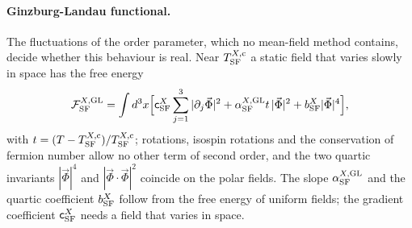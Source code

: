 \documentclass[aps,prd,twocolumn,superscriptaddress,nofootinbib,floatfix,longbibliography]{revtex4-2}
\newcommand{\SF}{{\rm SF}}
\begin{document}
\paragraph*{Ginzburg-Landau functional.}
The fluctuations of the order parameter, which no mean-field method contains, decide whether this behaviour is real.
Near $T^{X,{\rm c}}_\SF$ a static field that varies slowly in space has the free energy
\begin{equation}
\mathcal F^{X,{\rm GL}}_\SF=\int d^3x\Big[\mathsf c^X_\SF\sum_{j=1}^3|\partial_j\vec\Phi|^2+\alpha^{X,{\rm GL}}_\SF t\,|\vec\Phi|^2+b^X_\SF|\vec\Phi|^4\Big],
\label{eq:GL}
\end{equation}
with $t=(T-T^{X,{\rm c}}_\SF)/T^{X,{\rm c}}_\SF$; rotations, isospin rotations and the conservation of fermion number allow no other
term of second order, and the two quartic invariants $|\vec\Phi|^4$ and $|\vec\Phi\cdot\vec\Phi|^2$ coincide on the polar fields.
The slope $\alpha^{X,{\rm GL}}_\SF$ and the quartic coefficient $b^X_\SF$ follow from the free energy of uniform fields; the
gradient coefficient $\mathsf c^X_\SF$ needs a field that varies in space.
\end{document}
